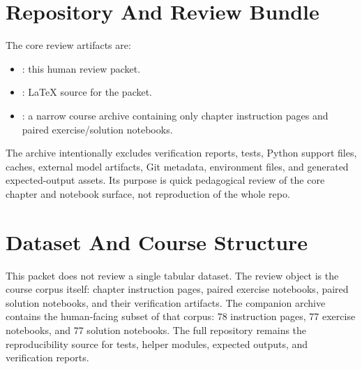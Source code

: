 \documentclass[11pt]{article}
\begin{document}
\section{Repository And Review Bundle}
The core review artifacts are:
\begin{itemize}
  \item {}: this human review packet.
  \item {}: LaTeX source for the packet.
  \item {}: a
  narrow course archive containing only chapter instruction pages and paired
  exercise/solution notebooks.
\end{itemize}

The archive intentionally excludes verification reports, tests, Python support
files, caches, external model artifacts, Git metadata, environment files, and
generated expected-output assets. Its purpose is quick pedagogical review of
the core chapter and notebook surface, not reproduction of the whole repo.

\section{Dataset And Course Structure}
This packet does not review a single tabular dataset. The review object is the
course corpus itself: chapter instruction pages, paired exercise notebooks,
paired solution notebooks, and their verification artifacts. The companion
archive contains the human-facing subset of that corpus: 78 instruction pages,
77 exercise notebooks, and 77 solution notebooks. The full repository remains
the reproducibility source for tests, helper modules, expected outputs, and
verification reports.
\end{document}
